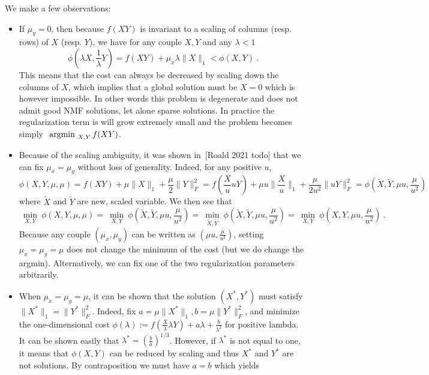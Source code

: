 \documentclass[a4paper, 11pt]{article}
\begin{document}
We make a few observations:
\begin{itemize}
  \item If \( \mu_y =0\), then because \( f(XY) \) is invariant to a scaling of columns (resp. rows) of \( X \) (resp. \( Y \)), we have for any couple \( X,Y \) and any \( \lambda<1 \)
  \begin{equation}
      \phi(\lambda X, \frac{1}{\lambda} Y) = f(XY) + \mu_x \lambda \|X\|_1 < \phi(X,Y)~.
  \end{equation}
  This means that the cost can always be decreased by scaling down the columns of \( X \), which implies that a global solution must be \( X=0 \) which is however impossible. In other words this problem is degenerate and does not admit good NMF solutions, let alone sparse solutions. In practice the regularization term is will grow extremely small and the problem becomes simply \( \mathop{\text{~argmin~}}_{X,Y} f(XY) \).
  \item Because of the scaling ambiguity, it was shown in~\cite{}[Roald 2021 todo] that we can fix \( \mu_x = \mu_y \) without loss of generality. Indeed, for any positive $u$,
  \begin{equation}
    \phi(X,Y,\mu,\mu) = f(XY) + \mu \|X\|_1 + \frac{\mu}{2} \|Y\|_F^2 = f(\frac{X}{u} uY) + \mu u  \|\frac{X}{u} \|_1 + \frac{\mu}{2u^2} \|uY\|_F^2 = \phi(\tilde{X},\tilde{Y}, \mu u, \frac{\mu}{u^2})
  \end{equation}
  where \( \tilde{X} \) and \( \tilde{Y} \) are new, scaled variable. We then see that
  \begin{equation}\label{eq:equiv-reg}
    \underset{X,Y}{~\min~} \phi(X,Y,\mu,\mu) = \underset{X,Y}{~\min~} \phi(\tilde{X},\tilde{Y},\mu u,\frac{\mu}{u^2}) = \underset{\tilde{X},\tilde{Y}}{~\min~} \phi(\tilde{X},\tilde{Y},\mu u,\frac{\mu}{u^2}) =  \underset{X,Y}{~\min~} \phi(X,Y,\mu u,\frac{\mu}{u^2})~.
  \end{equation}
  Because any couple \( (\mu_x,\mu_y) \) can be written as \( (\mu u, \frac{\mu}{u^2}) \), setting \( \mu_x = \mu_y = \mu \) does not change the minimum of the cost (but we do change the argmin). Alternatively, we can fix one of the two regularization parameters arbitrarily.
  \item When \( \mu_x = \mu_y = \mu \), it can be shown that the solution \((X^\ast,Y^\ast)\) must satisfy \( \|X^\ast\|_1 = \|Y^\ast\|_F^2 \). Indeed, fix \(a=\mu\|X^\ast\|_1, b=\mu\|Y^\ast\|_F^2\), and minimize the one-dimensional cost
  \( \phi(\lambda):= f(\frac{X}{\lambda} \lambda Y) + a \lambda + \frac{b}{\lambda^2}\) for positive lambda. It can be shown easily that \( \lambda^\ast = (\frac{b}{a})^{1/3} \). However, if \( \lambda^\ast \) is not equal to one, it means that \( \phi(X,Y) \) can be reduced by scaling and thus \( X^\ast \) and \( Y^\ast \) are not solutions. By contraposition we must have \( a=b \) which yields

\end{itemize}
\end{document}
